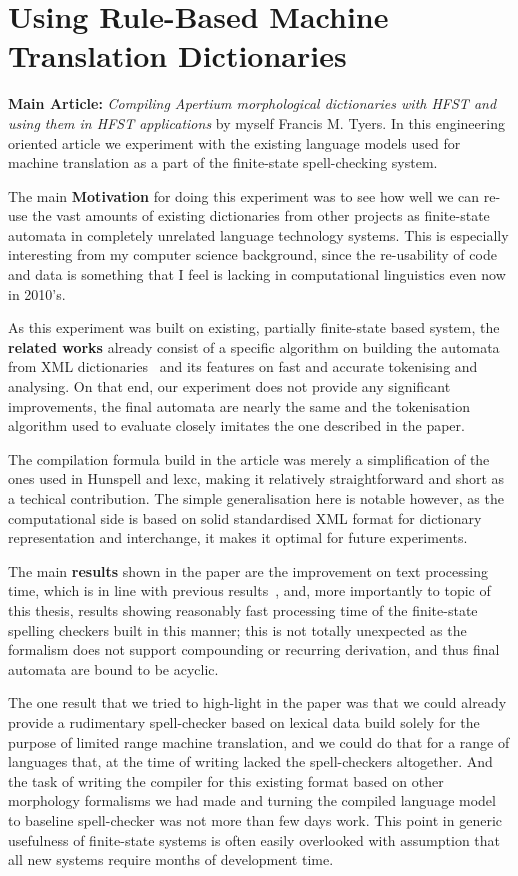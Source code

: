 \documentclass[officiallayout]{unihelcompling}
\begin{document}
\section{Using Rule-Based Machine Translation Dictionaries}
\label{sec:apertium}

\textbf{Main Article:} \emph{Compiling Apertium morphological dictionaries with
HFST and using them in HFST applications} by myself Francis M. Tyers. In this
engineering oriented article we experiment with the existing language models
used for machine translation as a part of the finite-state spell-checking
system.

The main \textbf{Motivation} for doing this experiment was to see how well we
can re-use the vast amounts of existing dictionaries from other projects as
finite-state automata in completely unrelated language technology systems.
This is especially interesting from my computer science background, since
the re-usability of code and data is something that I feel is lacking in
computational linguistics even now in 2010's.

As this experiment was built on existing, partially finite-state based system,
the \textbf{related works} already consist of a specific algorithm on building
the automata from XML dictionaries~\citep{rojas2005construccion} and its
features on fast and accurate tokenising and analysing. On that end,
our experiment does not provide any significant improvements, the final
automata are nearly the same and the tokenisation algorithm used to evaluate
closely imitates the one described in the paper.

The compilation formula build in the article was merely a simplification of
the ones used in Hunspell and lexc, making it relatively straightforward and
short as a techical contribution. The simple generalisation here is notable
however, as the computational side is based on solid standardised XML
format for dictionary representation and interchange, it makes it optimal
for future experiments.

The main \textbf{results} shown in the paper are the improvement on text
processing time, which is in line with previous
results~\citep{silfverberg2009hfst}, and, more importantly to topic of this
thesis, results showing reasonably fast processing time of the finite-state
spelling checkers built in this manner; this is not totally unexpected as the
formalism does not support compounding or recurring derivation, and thus final
automata are bound to be acyclic. 

The one result that we tried to high-light in the paper was that we could
already provide a rudimentary spell-checker based on lexical data build solely
for the purpose of limited range machine translation, and we could do that for
a range of languages that, at the time of writing lacked the spell-checkers
altogether. And the task of writing the compiler for this existing format
based on other morphology formalisms we had made and turning the compiled
language model to baseline spell-checker was not more than few days work. This
point in generic usefulness of finite-state systems is often easily overlooked
with assumption that all new systems require months of development time.
\end{document}
